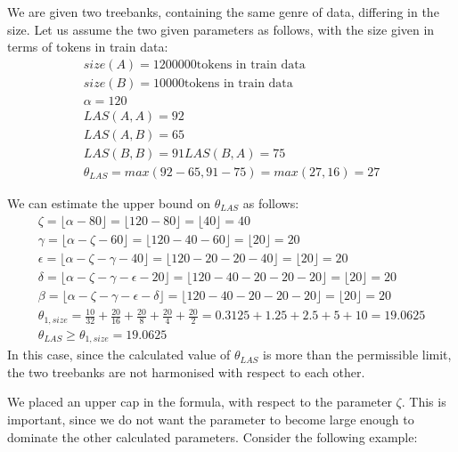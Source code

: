 \begin{example}
We are given two treebanks, containing the same genre of data, differing in the size. Let us assume the two given parameters as follows, with the size given in terms of tokens in train data:
\begin{gather*}
    size(A) = 1 200 000 \text{tokens in train data}\\
    size(B) = 10 000 \text{tokens in train data}\\
    \alpha = 120\\
    LAS(A,A) = 92\\
    LAS(A,B) = 65\\
    LAS(B,B) = 91
    LAS(B,A) = 75\\
    \theta_{LAS} = max(92-65, 91-75) = max(27, 16) = 27
\end{gather*}

We can estimate the upper bound on \(\theta_{LAS}\) as follows:
\begin{gather*}
\zeta = \lfloor\alpha - 80\rfloor = \lfloor120-80\rfloor = \lfloor40\rfloor = 40\\
\gamma = \lfloor\alpha - \zeta - 60\rfloor = \lfloor120-40-60\rfloor = \lfloor20\rfloor = 20\\
\epsilon = \lfloor\alpha - \zeta - \gamma -40\rfloor = \lfloor120-20-20-40\rfloor = \lfloor20\rfloor = 20\\
\delta = \lfloor\alpha - \zeta - \gamma - \epsilon - 20\rfloor = \lfloor120-40-20-20-20\rfloor = \lfloor20\rfloor = 20\\
\beta = \lfloor\alpha-\zeta-\gamma-\epsilon-\delta\rfloor = \lfloor120-40-20-20-20\rfloor = \lfloor20\rfloor = 20\\
\theta_{1, size} = \frac{10}{32} + \frac{20}{16} + \frac{20}{8} + \frac{20}{4} + \frac{20}{2} = 0.3125 + 1.25 + 2.5 + 5 + 10 = 19.0625\\
\theta_{LAS} \geq \theta_{1, size} = 19.0625
\end{gather*}
In this case, since the calculated value of \(\theta_{LAS}\) is more than the permissible limit, the two treebanks are not harmonised with respect to each other.
\end{example}

We placed an upper cap in the formula, with respect to the parameter \(\zeta\). This is important, since we do not want the parameter to become large enough to dominate the other calculated parameters. Consider the following example:

